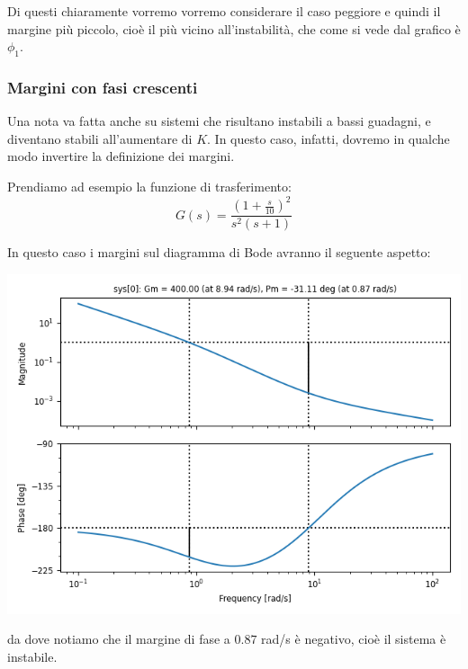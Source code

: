 \documentclass[a4paper,11pt]{article}
\begin{document}
Di questi chiaramente vorremo vorremo considerare il caso peggiore e quindi il margine più piccolo, cioè il più vicino all'instabilità, che come si vede dal grafico è $\phi_1$.

\subsubsection{Margini con fasi crescenti}
Una nota va fatta anche su sistemi che risultano instabili a bassi guadagni, e diventano stabili all'aumentare di $K$.
In questo caso, infatti, dovremo in qualche modo invertire la definizione dei margini.

Prendiamo ad esempio la funzione di trasferimento:
$$
G(s) = \frac{\left(1 + \frac{s}{10}\right)^2}{s^2 (s + 1)}
$$

\noindent

\begin{minipage}{\textwidth}

	In questo caso i margini sul diagramma di Bode avranno il seguente aspetto:
	\begin{center}
		\includegraphics[scale=0.75]{../figures/bode_margin_weird.png}
	\end{center}

\end{minipage}

da dove notiamo che il margine di fase a $0.87$ rad/s è negativo, cioè il sistema è instabile.
\end{document}
